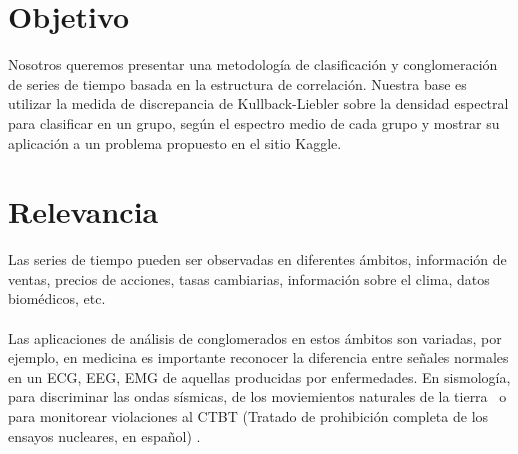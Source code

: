 \documentclass[twocolumn,10pt]{asme2ej}
\begin{document}
\section*{Objetivo} %
\label{sec:objetivo}

Nosotros queremos presentar una metodolog\'ia de clasificaci\'on y conglomeraci\'on de series de tiempo basada en la estructura de correlaci\'on. Nuestra base es utilizar la medida de discrepancia de Kullback-Liebler sobre la densidad espectral para clasificar en un grupo, seg\'un el espectro medio de cada grupo y mostrar su aplicaci\'on a un problema propuesto en el sitio Kaggle.


\section*{Relevancia} %
\label{sec:relevancia}
Las series de tiempo pueden ser observadas en diferentes \'ambitos, informaci\'on de ventas, precios de acciones, tasas cambiarias, informaci\'on sobre el clima, datos biom\'edicos, etc. ~\cite{TIME_SERIES_CLUSTERING}\\\\
Las aplicaciones de an\'alisis de conglomerados en estos \'ambitos son variadas, por ejemplo, en medicina es importante reconocer la diferencia entre se\~nales normales en un ECG, EEG, EMG de aquellas producidas por enfermedades. En sismolog\'ia, para discriminar las ondas s\'ismicas, de los moviemientos naturales de la tierra~\cite{TIME_SERIES_CLUSTERING_2} o para monitorear violaciones al CTBT (Tratado de prohibici\'on completa de los ensayos nucleares, en espa\~nol) \cite{SUBJ_SP1}.\\
\end{document}
